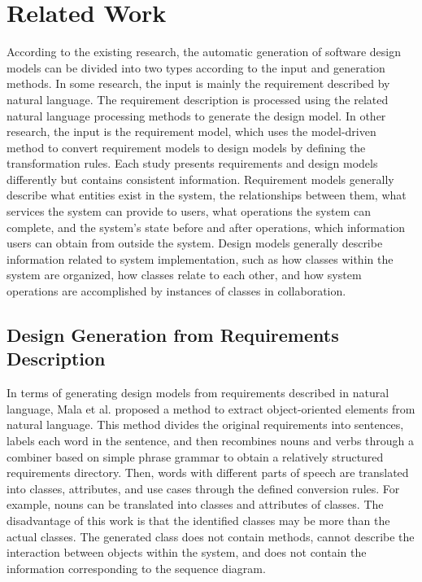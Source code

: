 \documentclass[pdflatex,sn-mathphys-num]{sn-jnl}%
\theoremstyle{thmstyleone}%
\theoremstyle{thmstyletwo}%
\theoremstyle{thmstylethree}%
\begin{document}
\section{Related Work}
According to the existing research, the automatic generation of software design models can be divided into two types according to the input and generation methods. In some research, the input is mainly the requirement described by natural language. The requirement description is processed using the related natural language processing methods to generate the design model. In other research, the input is the requirement model, which uses the model-driven method to convert requirement models to design models by defining the transformation rules. Each study presents requirements and design models differently but contains consistent information. Requirement models generally describe what entities exist in the system, the relationships between them, what services the system can provide to users, what operations the system can complete, and the system's state before and after operations, which information users can obtain from outside the system. Design models generally describe information related to system implementation, such as how classes within the system are organized, how classes relate to each other, and how system operations are accomplished by instances of classes in collaboration.

\subsection{Design Generation from Requirements Description}
In terms of generating design models from requirements described in natural language, Mala et al.\cite{RequirementsElicitor} proposed a method to extract object-oriented elements from natural language. This method divides the original requirements into sentences, labels each word in the sentence, and then recombines nouns and verbs through a combiner based on simple phrase grammar to obtain a relatively structured requirements directory. Then, words with different parts of speech are translated into classes, attributes, and use cases through the defined conversion rules. For example, nouns can be translated into classes and attributes of classes. The disadvantage of this work is that the identified classes may be more than the actual classes. The generated class does not contain methods, cannot describe the interaction between objects within the system, and does not contain the information corresponding to the sequence diagram.
\end{document}
